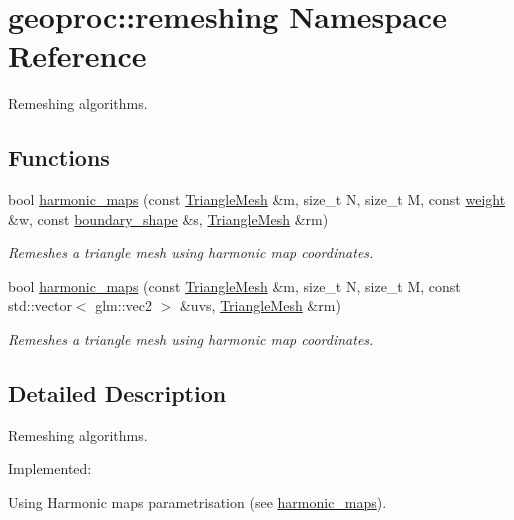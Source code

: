 \hypertarget{namespacegeoproc_1_1remeshing}{}\section{geoproc\+:\+:remeshing Namespace Reference}
\label{namespacegeoproc_1_1remeshing}


Remeshing algorithms.  


\subsection*{Functions}
\begin{DoxyCompactItemize}
\item 
bool \hyperlink{namespacegeoproc_1_1remeshing_a5ed68eab2cd304f825321c46cdcdc17e}{harmonic\+\_\+maps} (const \hyperlink{classgeoproc_1_1TriangleMesh}{Triangle\+Mesh} \&m, size\+\_\+t N, size\+\_\+t M, const \hyperlink{namespacegeoproc_a12e5a10581b53b9dd9a509127527f843}{weight} \&w, const \hyperlink{namespacegeoproc_a494da744a805b80f842402f0a806ccfc}{boundary\+\_\+shape} \&s, \hyperlink{classgeoproc_1_1TriangleMesh}{Triangle\+Mesh} \&rm)
\begin{DoxyCompactList}\small\item\em Remeshes a triangle mesh using harmonic map coordinates. \end{DoxyCompactList}\item 
bool \hyperlink{namespacegeoproc_1_1remeshing_a44a30c31cdb35181ac57b48911aa47a1}{harmonic\+\_\+maps} (const \hyperlink{classgeoproc_1_1TriangleMesh}{Triangle\+Mesh} \&m, size\+\_\+t N, size\+\_\+t M, const std\+::vector$<$ glm\+::vec2 $>$ \&uvs, \hyperlink{classgeoproc_1_1TriangleMesh}{Triangle\+Mesh} \&rm)
\begin{DoxyCompactList}\small\item\em Remeshes a triangle mesh using harmonic map coordinates. \end{DoxyCompactList}\end{DoxyCompactItemize}


\subsection{Detailed Description}
Remeshing algorithms. 

Implemented\+:
\begin{DoxyItemize}
\item Using Harmonic maps\textquotesingle{} parametrisation (see \hyperlink{namespacegeoproc_1_1remeshing_a5ed68eab2cd304f825321c46cdcdc17e}{harmonic\+\_\+maps}). 
\end{DoxyItemize}

